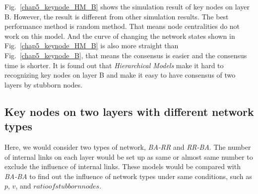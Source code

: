 Fig.~\ref{chap5_keynode_HM_B} shows the simulation result of key nodes on layer B. However, the result is different from other simulation results. The best performance method is random method. That means node centralities do not work on this model. And the curve of changing the network states shown in Fig.~\ref{chap5_keynode_HM_B} is also more straight than Fig.~\ref{chap5_keynode_B}, that means the consensus is easier and the consensus time is shorter. It is found out that \textit{Hierarchical Models} make it hard to recognizing key nodes on layer B and make it easy to have consensus of two layers by stubborn nodes. \\

\subsection{Key nodes on two layers with different network types}
Here, we would consider two types of network, \textit{BA-RR} and \textit{RR-BA}. The number of internal links on each layer would be set up as same or almost same number to exclude the influence of internal links. These models would be compared with \textit{BA-BA} to find out the influence of network types under same conditions, such as $p$, $v$, and $ratio of stubborn nodes$.  

